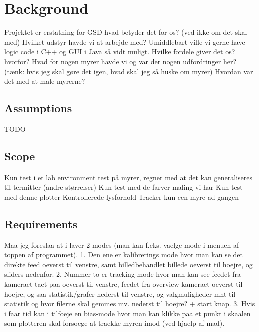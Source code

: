 
\section{Background}

Projektet er erstatning for GSD hvad betyder det for os? (ved ikke om det skal med)
Hvilket udstyr havde vi at arbejde med?
Umiddlebart ville vi gerne have logic code i C++ og GUI i Java så vidt muligt. Hvilke fordele giver det os? hvorfor?
Hvad for nogen myrer havde vi og var der nogen udfordringer her? (tænk: hvis jeg skal gøre det igen, hvad skal jeg så huske om myrer)
Hvordan var det med at male myrerne?

\subsection{Assumptions}

TODO

\subsection{Scope}

Kun test i et lab environment
test på myrer, regner med at det kan generaliseres til termitter (andre størrelser)
Kun test med de farver maling vi har
Kun test med denne plotter
Kontrollerede lysforhold
Tracker kun een myre ad gangen

\subsection{Requirements}

Maa jeg foreslaa at i laver 2 modes (man kan f.eks. vaelge mode i menuen
af toppen af programmet).
1. Den ene er kalibrerings mode hvor man kan se det direkte feed oeverst
til venstre, samt billedbehandlet billede oeverst til hoejre, og sliders
nedenfor.
2. Nummer to er tracking mode hvor man kan see feedet fra kameraet taet
paa oeverst til venstre, feedet fra overview-kameraet oeverst til hoejre,
og saa statistik/grafer nederst til venstre, og valgmuligheder mht til
statistik og hvor filerne skal gemmes mv. nederst til hoejre? + start
knap.
3. Hvis i faar tid kan i tilfoeje en bias-mode hvor man kan klikke paa et
punkt i skaalen som plotteren skal forsoege at traekke myren imod (ved
hjaelp af mad).


